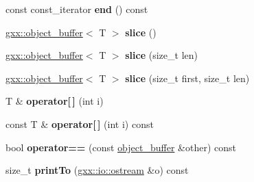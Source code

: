 \begin{DoxyCompactItemize}
\item 
const const\+\_\+iterator {\bfseries end} () const \hypertarget{classgxx_1_1object__buffer_a229f27a3ac0c72c941b69a4d05400def}{}\label{classgxx_1_1object__buffer_a229f27a3ac0c72c941b69a4d05400def}

\item 
\hyperlink{classgxx_1_1object__buffer}{gxx\+::object\+\_\+buffer}$<$ T $>$ {\bfseries slice} ()\hypertarget{classgxx_1_1object__buffer_a044aaf75faaa3ee932a2864ee60b7fd5}{}\label{classgxx_1_1object__buffer_a044aaf75faaa3ee932a2864ee60b7fd5}

\item 
\hyperlink{classgxx_1_1object__buffer}{gxx\+::object\+\_\+buffer}$<$ T $>$ {\bfseries slice} (size\+\_\+t len)\hypertarget{classgxx_1_1object__buffer_a103855f389012136daad1be95ddc7fb9}{}\label{classgxx_1_1object__buffer_a103855f389012136daad1be95ddc7fb9}

\item 
\hyperlink{classgxx_1_1object__buffer}{gxx\+::object\+\_\+buffer}$<$ T $>$ {\bfseries slice} (size\+\_\+t first, size\+\_\+t len)\hypertarget{classgxx_1_1object__buffer_ad91409d17463ab66efeedb06604a032d}{}\label{classgxx_1_1object__buffer_ad91409d17463ab66efeedb06604a032d}

\item 
T \& {\bfseries operator\mbox{[}$\,$\mbox{]}} (int i)\hypertarget{classgxx_1_1object__buffer_a6ab82ba7b3ebfcc2f0eefe3520f79c0f}{}\label{classgxx_1_1object__buffer_a6ab82ba7b3ebfcc2f0eefe3520f79c0f}

\item 
const T \& {\bfseries operator\mbox{[}$\,$\mbox{]}} (int i) const \hypertarget{classgxx_1_1object__buffer_a550c429ef4583ce1c0d4daa6b274cfd8}{}\label{classgxx_1_1object__buffer_a550c429ef4583ce1c0d4daa6b274cfd8}

\item 
bool {\bfseries operator==} (const \hyperlink{classgxx_1_1object__buffer}{object\+\_\+buffer} \&other) const \hypertarget{classgxx_1_1object__buffer_a0a915f7c618532e215c2d8bab704d3bc}{}\label{classgxx_1_1object__buffer_a0a915f7c618532e215c2d8bab704d3bc}

\item 
size\+\_\+t {\bfseries print\+To} (\hyperlink{classgxx_1_1io_1_1ostream}{gxx\+::io\+::ostream} \&o) const \hypertarget{classgxx_1_1object__buffer_a724dd5d02dcf3f1029d2c665e49340b1}{}\label{classgxx_1_1object__buffer_a724dd5d02dcf3f1029d2c665e49340b1}

\end{DoxyCompactItemize}
